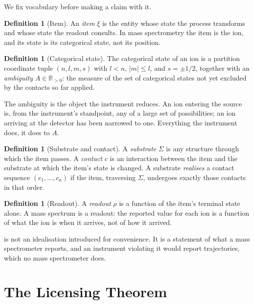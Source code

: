 \documentclass[11pt,a4paper]{article}
\theoremstyle{plain}
\theoremstyle{definition}
\newtheorem{definition}[theorem]{Definition}
\theoremstyle{remark}
\newcommand{\Rpos}{\mathbb{R}_{>0}}
\newcommand{\Amb}{A}
\newcommand{\Sub}{\Sigma}
\newcommand{\Cont}{c}
\newcommand{\Item}{\xi}
\newcommand{\Read}{\rho}
\begin{document}
We fix vocabulary before making a claim with it.

\begin{definition}[Item]
\label{def:item}
An \emph{item} $\Item$ is the entity whose state the process transforms and
whose state the readout consults. In mass spectrometry the item is the ion, and
its state is its categorical state, not its position.
\end{definition}

\begin{definition}[Categorical state]
\label{def:catstate}
The categorical state of an ion is a partition coordinate tuple
$(n, l, m, s)$ with $l < n$, $|m| \le l$, and $s = \pm 1/2$, together with an
\emph{ambiguity} $\Amb \in \Rpos$: the measure of the set of categorical states
not yet excluded by the contacts so far applied.
\end{definition}

The ambiguity is the object the instrument reduces. An ion entering the source
is, from the instrument's standpoint, any of a large set of possibilities; an
ion arriving at the detector has been narrowed to one. Everything the instrument
does, it does to $\Amb$.

\begin{definition}[Substrate and contact]
\label{def:substrate}
A \emph{substrate} $\Sub$ is any structure through which the item passes. A
\emph{contact} $\Cont$ is an interaction between the item and the substrate at
which the item's state is changed. A substrate \emph{realises} a contact
sequence $(\Cont_1,\dots,\Cont_n)$ if the item, traversing $\Sub$, undergoes
exactly those contacts in that order.
\end{definition}

\begin{definition}[Readout]
\label{def:readout}
A \emph{readout} $\Read$ is a function of the item's terminal state alone. A
mass spectrum is a readout: the reported value for each ion is a function of
what the ion is when it arrives, not of how it arrived.
\end{definition}

 is not an idealisation introduced for convenience. It is a
statement of what a mass spectrometer reports, and an instrument violating it
would report trajectories, which no mass spectrometer does.

\section{The Licensing Theorem}
\label{sec:licensing}
\end{document}

